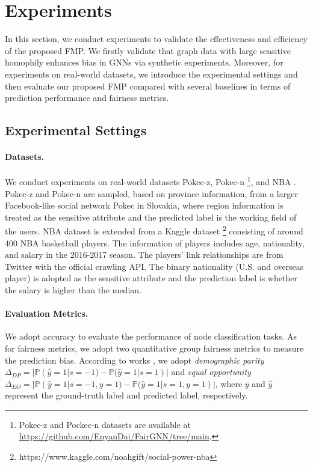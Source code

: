 \documentclass[letterpaper]{article} %
\theoremstyle{plain}
\theoremstyle{definition}
\theoremstyle{remark}
\begin{document}
\section{Experiments}
In this section, we conduct experiments to validate the effectiveness and efficiency of the proposed FMP. We firstly validate that graph data with large sensitive homophily enhances bias in GNNs via synthetic experiments. Moreover, for experiments on real-world datasets, we
introduce the experimental settings and then evaluate our proposed FMP compared with several baselines in terms of prediction performance and fairness metrics. 

\subsection{Experimental Settings}
\paragraph{Datasets.} We conduct experiments on real-world datasets Pokec-z, Pokec-n \footnote{Pokec-z and Pockec-n datasets are available at \url{https://github.com/EnyanDai/FairGNN/tree/main}.}, and NBA \citep{dai2021say}. Pokec-z and Pokec-n are sampled, based on province information, from a larger Facebook-like social network Pokec \citep{takac2012data} in Slovakia, where region information is treated as the sensitive attribute and the predicted label is the working field of the users. NBA dataset is extended from a Kaggle dataset \footnote{https://www.kaggle.com/noahgift/social-power-nba} consisting of around 400 NBA basketball players. The information of players includes age, nationality, and salary in the 2016-2017 season. The players' link relationships are from Twitter with the official crawling API. The binary nationality (U.S. and overseas player) is adopted as the sensitive attribute and the prediction label is whether the salary is higher than the median. 

\paragraph{Evaluation Metrics.} We adopt accuracy to evaluate the performance of node classification tasks. As for fairness metrics, we adopt two quantitative group fairness metrics to measure the prediction bias. According to works \citep{louizos2015variational,beutel2017data}, we adopt \emph{demographic parity} $\Delta_{DP}=|\mathbb{P}(\hat{y}=1|s=-1)-\mathbb{P}(\hat{y}=1|s=1)|$ and \emph{equal opportunity} $\Delta_{EO}=|\mathbb{P}(\hat{y}=1|s=-1, y=1)-\mathbb{P}(\hat{y}=1|s=1, y=1)|$, where $y$ and $\hat{y}$ represent the ground-truth label and predicted label, respectively. 
\end{document}
